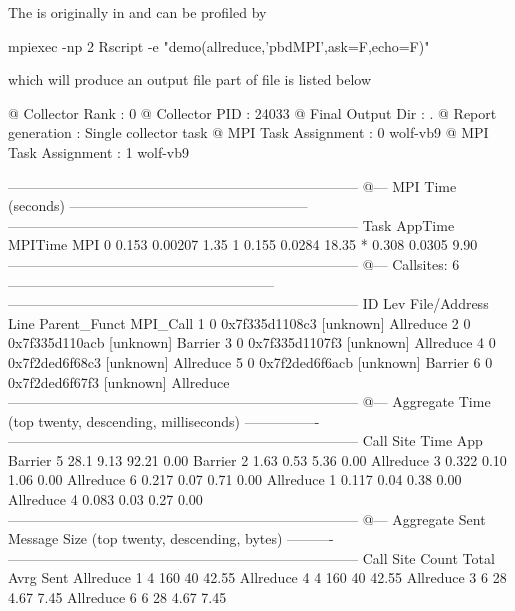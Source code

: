 The  is originally in  and can be profiled by
\begin{Code}
mpiexec -np 2 Rscript -e "demo(allreduce,'pbdMPI',ask=F,echo=F)"
\end{Code}
which will produce an output file 
part of file is listed below
\begin{Output}
@ Collector Rank           : 0
@ Collector PID            : 24033
@ Final Output Dir         : .
@ Report generation        : Single collector task
@ MPI Task Assignment      : 0 wolf-vb9
@ MPI Task Assignment      : 1 wolf-vb9

---------------------------------------------------------------------------
  @--- MPI Time (seconds) ---------------------------------------------------
  ---------------------------------------------------------------------------
  Task    AppTime    MPITime     MPI%
0      0.153    0.00207     1.35
1      0.155     0.0284    18.35
*      0.308     0.0305     9.90
---------------------------------------------------------------------------
  @--- Callsites: 6 ---------------------------------------------------------
  ---------------------------------------------------------------------------
  ID Lev File/Address        Line Parent_Funct             MPI_Call
1   0 0x7f335d1108c3           [unknown]                Allreduce
2   0 0x7f335d110acb           [unknown]                Barrier
3   0 0x7f335d1107f3           [unknown]                Allreduce
4   0 0x7f2ded6f68c3           [unknown]                Allreduce
5   0 0x7f2ded6f6acb           [unknown]                Barrier
6   0 0x7f2ded6f67f3           [unknown]                Allreduce
---------------------------------------------------------------------------
  @--- Aggregate Time (top twenty, descending, milliseconds) ----------------
  ---------------------------------------------------------------------------
  Call                 Site       Time    App%
Barrier                 5       28.1    9.13   92.21    0.00
Barrier                 2       1.63    0.53    5.36    0.00
Allreduce               3      0.322    0.10    1.06    0.00
Allreduce               6      0.217    0.07    0.71    0.00
Allreduce               1      0.117    0.04    0.38    0.00
Allreduce               4      0.083    0.03    0.27    0.00
---------------------------------------------------------------------------
  @--- Aggregate Sent Message Size (top twenty, descending, bytes) ----------
  ---------------------------------------------------------------------------
  Call                 Site      Count      Total       Avrg  Sent%
Allreduce               1          4        160         40  42.55
Allreduce               4          4        160         40  42.55
Allreduce               3          6         28       4.67   7.45
Allreduce               6          6         28       4.67   7.45
\end{Output}


